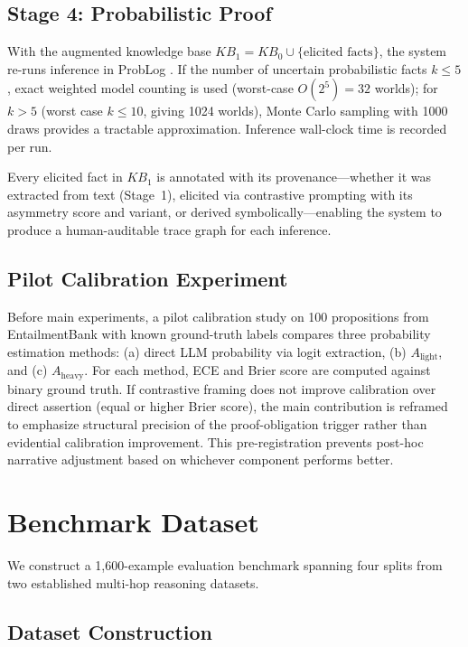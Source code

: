 \documentclass[11pt,letterpaper]{article}
\begin{document}
\subsection{Stage 4: Probabilistic Proof}

With the augmented knowledge base $KB_1 = KB_0 \cup \{\text{elicited facts}\}$, the system re-runs inference in ProbLog \citep{Raedt2007}. If the number of uncertain probabilistic
facts $k \leq 5$, exact weighted model counting is used (worst-case $O(2^5) = 32$ worlds); for $k > 5$ (worst case $k
\leq 10$, giving 1024 worlds), Monte Carlo sampling with 1000 draws provides a tractable approximation. Inference wall-clock
time is recorded per run.

Every elicited fact in $KB_1$ is annotated with its provenance---whether it was extracted from
text (Stage~1), elicited via contrastive prompting with its asymmetry score and variant, or derived symbolically---enabling
the system to produce a human-auditable trace graph for each inference.

\subsection{Pilot Calibration Experiment}

Before main experiments, a pilot calibration study on 100 propositions from EntailmentBank with known ground-truth labels
compares three probability estimation methods: (a) direct LLM probability via logit extraction, (b) $A_\text{light}$,
and (c) $A_\text{heavy}$. For each method, ECE and Brier score are computed against binary ground truth. If contrastive
framing does not improve calibration over direct assertion (equal or higher Brier score), the main contribution is reframed
to emphasize structural precision of the proof-obligation trigger rather than evidential calibration improvement. This
pre-registration prevents post-hoc narrative adjustment based on whichever component performs better.

\section{Benchmark Dataset}
\label{sec:benchmark}

We construct a 1,600-example evaluation benchmark spanning four splits from two established multi-hop reasoning datasets.

\subsection{Dataset Construction}
\end{document}
